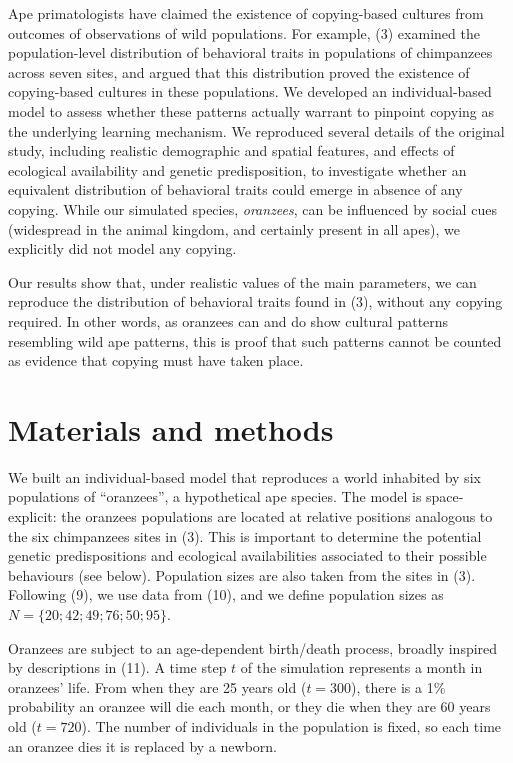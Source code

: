 \documentclass[9pt,twocolumn,twoside,]{pnas-new}
\begin{document}
Ape primatologists have claimed the existence of copying-based cultures
from outcomes of observations of wild populations. For example, (3)
examined the population-level distribution of behavioral traits in
populations of chimpanzees across seven sites, and argued that this
distribution proved the existence of copying-based cultures in these
populations. We developed an individual-based model to assess whether
these patterns actually warrant to pinpoint copying as the underlying
learning mechanism. We reproduced several details of the original study,
including realistic demographic and spatial features, and effects of
ecological availability and genetic predisposition, to investigate
whether an equivalent distribution of behavioral traits could emerge in
absence of any copying. While our simulated species, \emph{oranzees},
can be influenced by social cues (widespread in the animal kingdom, and
certainly present in all apes), we explicitly did not model any copying.

Our results show that, under realistic values of the main parameters, we
can reproduce the distribution of behavioral traits found in (3),
without any copying required. In other words, as oranzees can and do
show cultural patterns resembling wild ape patterns, this is proof that
such patterns cannot be counted as evidence that copying must have taken
place.

\section*{Materials and methods}\label{materials-and-methods}

We built an individual-based model that reproduces a world inhabited by
six populations of ``oranzees'', a hypothetical ape species. The model
is space-explicit: the oranzees populations are located at relative
positions analogous to the six chimpanzees sites in (3). This is
important to determine the potential genetic predispositions and
ecological availabilities associated to their possible behaviours (see
below). Population sizes are also taken from the sites in (3). Following
(9), we use data from (10), and we define population sizes as
\(N=\{20;42;49;76;50;95\}\).

Oranzees are subject to an age-dependent birth/death process, broadly
inspired by descriptions in (11). A time step \(t\) of the simulation
represents a month in oranzees' life. From when they are 25 years old
(\(t=300\)), there is a 1\% probability an oranzee will die each month,
or they die when they are 60 years old (\(t=720\)). The number of
individuals in the population is fixed, so each time an oranzee dies it
is replaced by a newborn.
\end{document}
